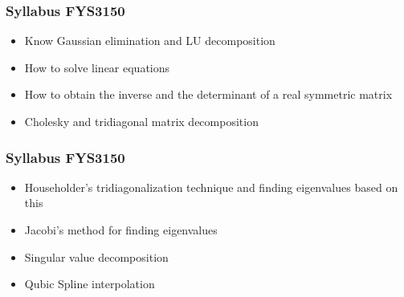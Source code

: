\documentclass{beamer}
\newenvironment{block_mdfboxadmon}[1][]{\begin{block}{#1}}{\end{block}}
\begin{document}
\begin{frame}
\frametitle{Syllabus FYS3150}

\begin{block_mdfboxadmon}
\begin{itemize}
  \item Know Gaussian elimination and LU decomposition

  \item How to solve linear equations

  \item How to obtain the inverse and the determinant of a real symmetric matrix

  \item Cholesky and tridiagonal matrix decomposition
\end{itemize}

\noindent
\end{block_mdfboxadmon}
\end{frame}

\begin{frame}
\frametitle{Syllabus FYS3150}

\begin{block_mdfboxadmon}
\begin{itemize}
  \item Householder's tridiagonalization technique and finding eigenvalues based on this

  \item Jacobi's method for finding eigenvalues

  \item Singular value decomposition

  \item Qubic Spline interpolation
\end{itemize}

\noindent
\end{block_mdfboxadmon}
\end{frame}
\end{document}
